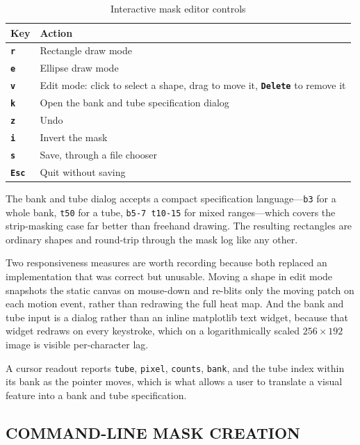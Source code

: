 \documentclass[tm]{ornltm}
\newcommand{\key}[1]{\textbf{\texttt{#1}}}
\begin{document}
\begin{table}[ht]
  \centering
  \caption{Interactive mask editor controls}
  \label{tab:maskkeys}
  \small
  \begin{tabular}{l p{}}
    \toprule
    Key & Action \\
    \midrule
    \key{r} & Rectangle draw mode \\
    \key{e} & Ellipse draw mode \\
    \key{v} & Edit mode: click to select a shape, drag to move it, \key{Delete}
      to remove it \\
    \key{k} & Open the bank and tube specification dialog \\
    \key{z} & Undo \\
    \key{i} & Invert the mask \\
    \key{s} & Save, through a file chooser \\
    \key{Esc} & Quit without saving \\
    \bottomrule
  \end{tabular}
\end{table}

The bank and tube dialog accepts a compact specification language---\texttt{b3}
for a whole bank, \texttt{t50} for a tube, \texttt{b5-7 t10-15} for mixed
ranges---which covers the strip-masking case far better than freehand drawing.
The resulting rectangles are ordinary shapes and round-trip through the mask log
like any other.

Two responsiveness measures are worth recording because both replaced an
implementation that was correct but unusable. Moving a shape in edit mode
snapshots the static canvas on mouse-down and re-blits only the moving patch on
each motion event, rather than redrawing the full heat map. And the bank and tube
input is a dialog rather than an inline matplotlib text widget, because that
widget redraws on every keystroke, which on a logarithmically scaled
$256\times192$ image is visible per-character lag.

A cursor readout reports \texttt{tube}, \texttt{pixel}, \texttt{counts},
\texttt{bank}, and the tube index within its bank as the pointer moves, which is
what allows a user to translate a visual feature into a bank and tube
specification.

\subsection{COMMAND-LINE MASK CREATION}
\end{document}
